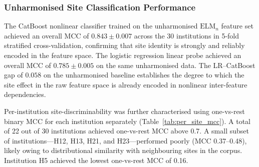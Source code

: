 \documentclass[preprint,12pt]{elsarticle}
\begin{document}
\subsubsection{Unharmonised Site Classification Performance}
The CatBoost nonlinear classifier trained on the unharmonised
$\mathrm{ELM}_n$ feature set achieved an overall MCC of
$0.843 \pm 0.007$ across the 30 institutions in 5-fold stratified
cross-validation, confirming that site identity is strongly and
reliably encoded in the feature space.
The logistic regression linear probe achieved an overall MCC of
$0.785 \pm 0.005$ on the same unharmonised data.
The LR--CatBoost gap of $0.058$ on the unharmonised baseline
establishes the degree to which the site effect in the raw feature
space is already encoded in nonlinear inter-feature dependencies.

Per-institution site-discriminability was further characterised
using one-vs-rest binary MCC for each institution separately
(Table~\ref{tab:per_site_mcc}).
A total of 22 out of 30 institutions achieved one-vs-rest MCC
above 0.7.
A small subset of institutions---H12, H13, H21, and
H23---performed poorly (MCC 0.37--0.48), likely owing to
distributional similarity with neighbouring sites in the corpus.
Institution H5 achieved the lowest one-vs-rest MCC of 0.16.
\end{document}
